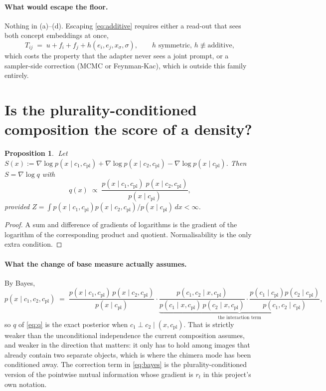 \documentclass[11pt]{article}
\newcommand{\xs}{x_\sigma}
\newcommand{\cpl}{c_{\mathrm{pl}}}
\theoremstyle{plain}
\newtheorem{proposition}{Proposition}
\theoremstyle{remark}
\begin{document}
\paragraph{What would escape the floor.}
Nothing in (a)--(d). Escaping \eqref{eq:additive} requires either a read-out that sees both
concept embeddings at once,
\begin{equation}
  T_{ij} \;=\; u + f_i + f_j + h(e_i, e_j, \xs, \sigma),
  \qquad h \text{ symmetric, } h \not\equiv \text{additive},
  \label{eq:escape}
\end{equation}
which costs the property that the adapter never sees a joint prompt, or a sampler-side
correction (MCMC or Feynman-Kac), which is outside this family entirely.

\section{Is the plurality-conditioned composition the score of a density?}

\begin{proposition}
\label{prop:density}
$\;$Let $S(x) := \nabla \log p(x \mid c_1, \cpl) + \nabla \log p(x \mid c_2, \cpl) -
\nabla \log p(x \mid \cpl)$. Then $S = \nabla \log q$ with
\begin{equation}
  q(x) \;\propto\; \frac{p(x \mid c_1, \cpl)\; p(x \mid c_2, \cpl)}{p(x \mid \cpl)},
  \label{eq:q}
\end{equation}
provided $Z = \int p(x\mid c_1,\cpl)p(x\mid c_2,\cpl)/p(x\mid\cpl)\,dx < \infty$.
\end{proposition}
\begin{proof}
A sum and difference of gradients of logarithms is the gradient of the logarithm of the
corresponding product and quotient. Normalisability is the only extra condition.
\end{proof}

\paragraph{What the change of base measure actually assumes.}
By Bayes,
\begin{equation}
  p(x \mid c_1, c_2, \cpl)
  \;=\; \frac{p(x\mid c_1,\cpl)\,p(x\mid c_2,\cpl)}{p(x\mid \cpl)}
  \cdot \underbrace{\frac{p(c_1,c_2 \mid x,\cpl)}{p(c_1\mid x,\cpl)\,p(c_2 \mid x,\cpl)}
  \cdot \frac{p(c_1\mid\cpl)p(c_2\mid\cpl)}{p(c_1,c_2\mid\cpl)}}_{\text{the interaction term}},
  \label{eq:bayes}
\end{equation}
so $q$ of \eqref{eq:q} is the exact posterior when $c_1 \perp c_2 \mid (x, \cpl)$. That is
strictly weaker than the unconditional independence the current composition assumes, and weaker
in the direction that matters: it only has to hold among images that already contain two
separate objects, which is where the chimera mode has been conditioned away. The correction
term in \eqref{eq:bayes} is the plurality-conditioned version of the pointwise mutual
information whose gradient is $r_t$ in this project's own notation.
\end{document}
